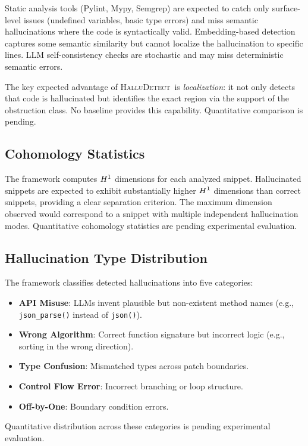 \documentclass[11pt]{article}
\newcommand{\HalluDetect}{\textsc{HalluDetect}}
\begin{document}
Static analysis tools (Pylint, Mypy, Semgrep) are expected to
catch only surface-level issues (undefined variables, basic type errors)
and miss semantic hallucinations where the code is syntactically valid.
Embedding-based detection captures some semantic similarity but cannot
localize the hallucination to specific lines.  LLM self-consistency
checks are stochastic and may miss deterministic semantic errors.

The key expected advantage of \HalluDetect\ is \emph{localization}: it not only
detects that code is hallucinated but identifies the exact region
via the support of the obstruction class.  No baseline provides
this capability.  Quantitative comparison is pending.


\subsection{Cohomology Statistics}

The framework computes $H^{1}$ dimensions for each analyzed snippet.
Hallucinated snippets are expected to exhibit substantially higher
$H^{1}$ dimensions than correct snippets, providing a clear
separation criterion.  The maximum dimension observed would correspond
to a snippet with multiple independent hallucination modes.
Quantitative cohomology statistics are pending experimental evaluation.


\subsection{Hallucination Type Distribution}

The framework classifies detected hallucinations into five categories:
\begin{itemize}[noitemsep]
  \item \textbf{API Misuse}: LLMs invent plausible but non-existent
        method names (e.g., \texttt{json\_parse()} instead of \texttt{json()}).
  \item \textbf{Wrong Algorithm}: Correct function signature but incorrect
        logic (e.g., sorting in the wrong direction).
  \item \textbf{Type Confusion}: Mismatched types across patch boundaries.
  \item \textbf{Control Flow Error}: Incorrect branching or loop structure.
  \item \textbf{Off-by-One}: Boundary condition errors.
\end{itemize}
Quantitative distribution across these categories is pending
experimental evaluation.
\end{document}
